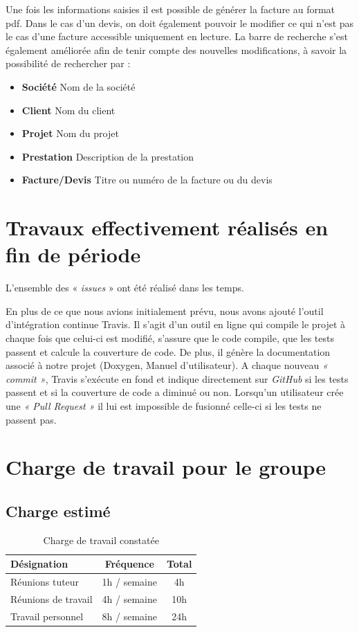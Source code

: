 \documentclass[12pt,a4paper,openany]{article}
\begin{document}
	Une fois les informations saisies il est possible de générer la facture au format pdf.
	Dans le cas d'un devis, on doit également pouvoir le modifier ce qui n'est pas le cas d'une facture accessible uniquement en lecture.
	La barre de recherche s'est également améliorée afin de tenir compte des nouvelles modifications, à savoir la possibilité de rechercher par : 
	\begin{itemize}
		\item \textbf{Société} Nom de la société
		\item \textbf{Client} Nom du client
		\item \textbf{Projet} Nom du projet
		\item \textbf{Prestation} Description de la prestation
		\item \textbf{Facture/Devis} Titre ou numéro de la facture ou du devis
	\end{itemize}  
	
	\section{Travaux effectivement réalisés en fin de période}\label{work}
	L'ensemble des « \textit{issues} » ont été réalisé dans les temps. 

	En plus de ce que nous avions initialement prévu, nous avons ajouté l'outil d'intégration continue Travis. Il s'agit d'un outil en ligne qui compile le projet à chaque fois que celui-ci est modifié, s'assure que le code compile, que les tests passent et calcule la couverture de code. De plus, il génère la documentation associé à notre projet (Doxygen, Manuel d'utilisateur).
	A chaque nouveau \textit{ « commit »}, Travis s'exécute en fond et indique directement sur \textit{GitHub} si les tests passent et si la couverture de code a diminué ou non. Lorsqu'un utilisateur crée une \textit{« Pull Request »} il lui est impossible de fusionné celle-ci si les tests ne passent pas. 

	\section{Charge de travail pour le groupe}
	\subsection{Charge estimé}
	\begin{table}[H]
		\centering
		\begin{tabular}{l|c|c}
			\textbf{Désignation} & \textbf{Fréquence} & \textbf{Total}\\
			\hline
			Réunions tuteur & 1h / semaine & 4h\\
			Réunions de travail & 4h / semaine & 10h\\
			Travail personnel & 8h / semaine & 24h
		\end{tabular}
		\caption{Charge de travail constatée}
	\end{table}
\end{document}
